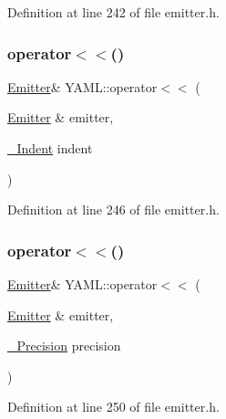 Definition at line 242 of file emitter.\+h.

\mbox{\label{namespace_y_a_m_l_a33ba2d3ca38db7def99e111d150aa134}} 
\subsubsection{\texorpdfstring{operator$<$$<$()}{operator<<()}\hspace{0.1cm}{\footnotesize\ttfamily [34/35]}}
{\footnotesize\ttfamily \mbox{\hyperlink{class_y_a_m_l_1_1_emitter}{Emitter}}\& Y\+A\+M\+L\+::operator$<$$<$ (\begin{DoxyParamCaption}\item[{\mbox{\hyperlink{class_y_a_m_l_1_1_emitter}{Emitter}} \&}]{emitter,  }\item[{\mbox{\hyperlink{struct_y_a_m_l_1_1___indent}{\+\_\+\+Indent}}}]{indent }\end{DoxyParamCaption})\hspace{0.3cm}{\ttfamily [inline]}}



Definition at line 246 of file emitter.\+h.

\mbox{\label{namespace_y_a_m_l_ab2d3cbd50dde933e752f6bee2e45f088}} 
\subsubsection{\texorpdfstring{operator$<$$<$()}{operator<<()}\hspace{0.1cm}{\footnotesize\ttfamily [35/35]}}
{\footnotesize\ttfamily \mbox{\hyperlink{class_y_a_m_l_1_1_emitter}{Emitter}}\& Y\+A\+M\+L\+::operator$<$$<$ (\begin{DoxyParamCaption}\item[{\mbox{\hyperlink{class_y_a_m_l_1_1_emitter}{Emitter}} \&}]{emitter,  }\item[{\mbox{\hyperlink{struct_y_a_m_l_1_1___precision}{\+\_\+\+Precision}}}]{precision }\end{DoxyParamCaption})\hspace{0.3cm}{\ttfamily [inline]}}



Definition at line 250 of file emitter.\+h.

